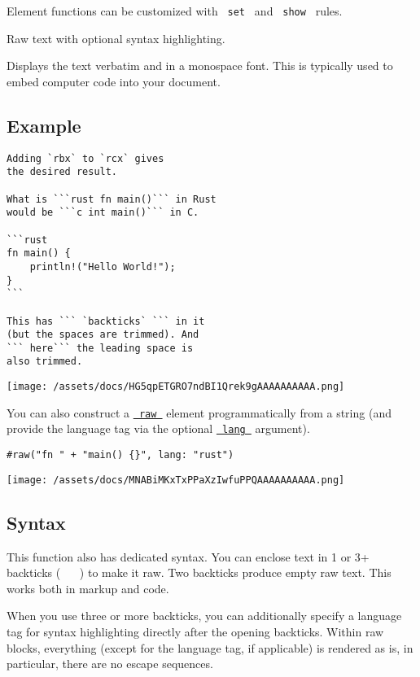 \label{element-tooltip}
Element functions can be customized with \texttt{\ set\ } and
\texttt{\ show\ } rules.

Raw text with optional syntax highlighting.

Displays the text verbatim and in a monospace font. This is typically
used to embed computer code into your document.

\subsection{Example}\label{example}

\begin{verbatim}
Adding `rbx` to `rcx` gives
the desired result.

What is ```rust fn main()``` in Rust
would be ```c int main()``` in C.

```rust
fn main() {
    println!("Hello World!");
}
```

This has ``` `backticks` ``` in it
(but the spaces are trimmed). And
``` here``` the leading space is
also trimmed.
\end{verbatim}

\texttt{[image: /assets/docs/HG5qpETGRO7ndBI1Qrek9gAAAAAAAAAA.png]}

You can also construct a
\href{/docs/reference/text/raw/}{\texttt{\ raw\ }} element
programmatically from a string (and provide the language tag via the
optional
\href{/docs/reference/text/raw/\#parameters-lang}{\texttt{\ lang\ }}
argument).

\begin{verbatim}
#raw("fn " + "main() {}", lang: "rust")
\end{verbatim}

\texttt{[image: /assets/docs/MNABiMKxTxPPaXzIwfuPPQAAAAAAAAAA.png]}

\subsection{Syntax}\label{syntax}

This function also has dedicated syntax. You can enclose text in 1 or 3+
backticks ( \texttt{\ \textasciigrave{}\ } ) to make it raw. Two
backticks produce empty raw text. This works both in markup and code.

When you use three or more backticks, you can additionally specify a
language tag for syntax highlighting directly after the opening
backticks. Within raw blocks, everything (except for the language tag,
if applicable) is rendered as is, in particular, there are no escape
sequences.

